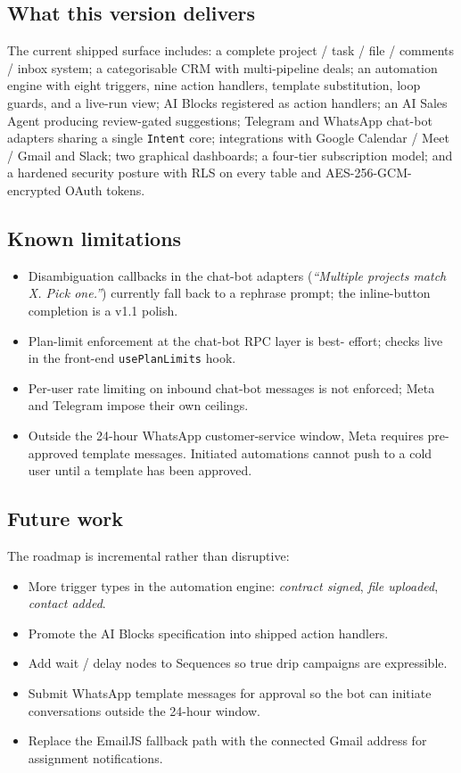\documentclass[11pt,a4paper,oneside]{article}
\newcommand{\code}[1]{\texttt{\small #1}}
\begin{document}
\subsection{What this version delivers}

The current shipped surface includes: a complete project / task / file
/ comments / inbox system; a categorisable CRM with multi-pipeline
deals; an automation engine with eight triggers, nine action handlers,
template substitution, loop guards, and a live-run view; AI Blocks
registered as action handlers; an AI Sales Agent producing
review-gated suggestions; Telegram and WhatsApp chat-bot adapters
sharing a single \code{Intent} core; integrations with Google Calendar
/ Meet / Gmail and Slack; two graphical dashboards; a four-tier
subscription model; and a hardened security posture with RLS on every
table and AES-256-GCM-encrypted OAuth tokens.

\subsection{Known limitations}

\begin{itemize}
  \item Disambiguation callbacks in the chat-bot adapters
    (\emph{``Multiple projects match X. Pick one.''}) currently fall
    back to a rephrase prompt; the inline-button completion is a
    v1.1 polish.
  \item Plan-limit enforcement at the chat-bot RPC layer is best-
    effort; checks live in the front-end \code{usePlanLimits} hook.
  \item Per-user rate limiting on inbound chat-bot messages is not
    enforced; Meta and Telegram impose their own ceilings.
  \item Outside the 24-hour WhatsApp customer-service window, Meta
    requires pre-approved template messages. Initiated automations
    cannot push to a cold user until a template has been approved.
\end{itemize}

\subsection{Future work}

The roadmap is incremental rather than disruptive:

\begin{itemize}
  \item More trigger types in the automation engine: \emph{contract
    signed}, \emph{file uploaded}, \emph{contact added}.
  \item Promote the AI Blocks specification into shipped action
    handlers.
  \item Add wait / delay nodes to Sequences so true drip campaigns are
    expressible.
  \item Submit WhatsApp template messages for approval so the bot can
    initiate conversations outside the 24-hour window.
  \item Replace the EmailJS fallback path with the connected Gmail
    address for assignment notifications.
\end{itemize}
\end{document}
